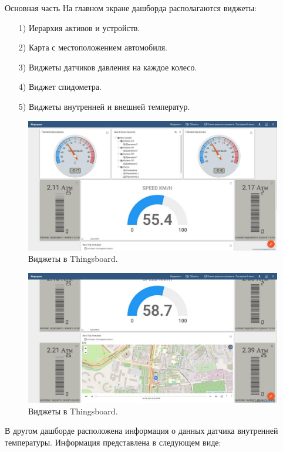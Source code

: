 \begin{chapter}{Основная часть}
    На главном экране дашборда располагаются виджеты:
    
	\begin{enumerate} 
      \item[1)]  Иерархия активов и устройств.
      \item[2)]  Карта с местоположением автомобиля.
      \item[3)]  Виджеты датчиков давления на каждое колесо.
      \item[4)]  Виджет спидометра.
      \item[5)]  Виджеты внутренней и внешней температур.
    \end{enumerate}

    \begin{figure}[!ht]
		\centering
		\includegraphics[scale=0.5]{pictures/2.jpg}
		\caption{Виджеты в Thingsboard.}
		\label{fig1}
	\end{figure}

    \begin{figure}[!ht]
		\centering
		\includegraphics[scale=0.5]{pictures/3.jpg}
		\caption{Виджеты в Thingsboard.}
		\label{fig1}
	\end{figure}
	
В другом дашборде расположена информация о данных датчика внутренней температуры. Информация представлена в следующем виде:


\end{chapter}
